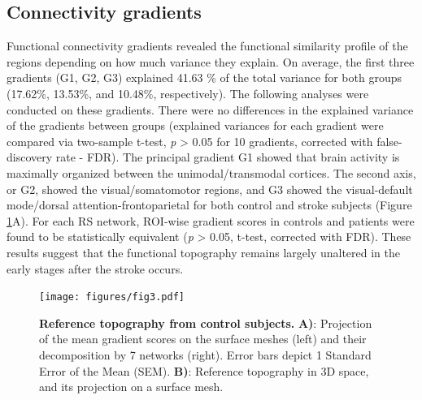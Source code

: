 \documentclass[fleqn,10pt]{wlscirep}
\begin{document}
\subsection*{Connectivity gradients}
Functional connectivity gradients revealed the functional similarity profile of the regions depending on how much variance they explain. On average, the first three gradients (G1, G2, G3) explained  41.63 \% of the total variance for both groups (17.62\%, 13.53\%, and 10.48\%, respectively). The following analyses were conducted on these gradients. There were no differences in the explained variance of the gradients between groups (explained variances for each gradient were compared via two-sample t-test, \emph{p} > 0.05 for 10 gradients, corrected with false-discovery rate - FDR).  The principal gradient G1 showed that brain activity is maximally organized between the unimodal/transmodal cortices. The second axis, or G2, showed the visual/somatomotor regions, and G3 showed the visual-default mode/dorsal attention-frontoparietal for both control and stroke subjects (Figure \ref{fig:summary}A). For each RS network, ROI-wise gradient scores in controls and patients were found to be statistically equivalent (\emph{p}  > 0.05, t-test, corrected with FDR). These results suggest that the functional topography remains largely unaltered in the early stages after the stroke occurs. %

\begin{figure}[]
\centering
\texttt{[image: figures/fig3.pdf]}
\caption{\label{fig:summary} \textbf{Reference topography from control subjects.} \textbf{A)}: Projection of the mean gradient scores on the surface meshes
(left) and their decomposition by 7 networks (right). Error bars depict 1 Standard Error of the Mean (SEM). \textbf{B)}: Reference
topography in 3D space, and its projection on a surface mesh.}
\end{figure}
\end{document}
